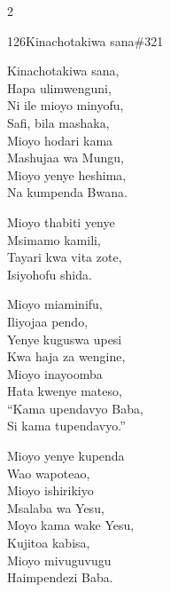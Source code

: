 \documentclass{article}
\begin{document}
\begin{multicols}{2}
\begin{hymn}{126}{Kinachotakiwa sana}{\#321}
\begin{stanza}
Kinachotakiwa sana,\\
Hapa ulimwenguni,\\
Ni ile mioyo minyofu,\\
Safi, bila mashaka,\\
Mioyo hodari kama\\
Mashujaa wa Mungu,\\
Mioyo yenye heshima,\\
Na kumpenda Bwana.
\end{stanza}
\begin{chorus}
Mioyo thabiti yenye\\
Msimamo kamili,\\
Tayari kwa vita zote,\\
Isiyohofu shida.
\end{chorus}
\begin{stanza}
Mioyo miaminifu,\\
Iliyojaa pendo,\\
Yenye kuguswa upesi\\
Kwa haja za wengine,\\
Mioyo inayoomba\\
Hata kwenye mateso,\\
``Kama upendavyo Baba,\\
Si kama tupendavyo.''
\end{stanza}
\begin{stanza}
Mioyo yenye kupenda\\
Wao wapoteao,\\
Mioyo ishirikiyo\\
Msalaba wa Yesu,\\
Moyo kama wake Yesu,\\
Kujitoa kabisa,\\
Mioyo mivuguvugu\\
Haimpendezi Baba.
\end{stanza}
\end{hymn}


\end{multicols}
\end{document}
